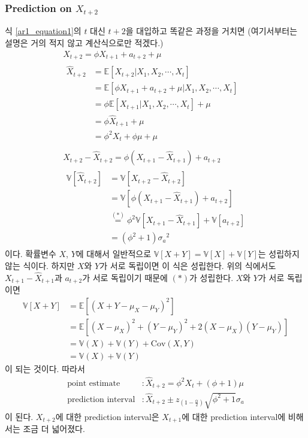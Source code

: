\documentclass{article}
\newcommand\cov{\ensuremath{\text{Cov}}}
\newcommand\sa{\ensuremath{{\sigma_a}}}
\begin{document}
\subsubsection{Prediction on \(X_{t+2}\)}
식 \eqref{ar1_equation1}의 \(t\) 대신 \(t+2\)을 대입하고 똑같은 과정을 거치면
(여기서부터는 설명은 거의 적지 않고 계산식으로만 적겠다.)
\begin{gather*}
X_{t+2}=\phi X_{t+1}+a_{t+2}+\mu\\
\begin{aligned}
\hat X_{t+2}
&=\mathbb E[X_{t+2}|X_1,X_2,\cdots,X_t]\\
&=\mathbb E[\phi X_{t+1}+a_{t+2}+\mu|X_1,X_2,\cdots,X_t]\\
&=\phi\mathbb E[X_{t+1}|X_1,X_2,\cdots,X_t]+\mu\\
&=\phi\hat X_{t+1}+\mu\\
&=\phi^2X_t+\phi\mu+\mu\\
\end{aligned}\\
X_{t+2}-\hat X_{t+2}=\phi\left(X_{t+1}-\hat X_{t+1}\right)+a_{t+2}\\
\begin{aligned}
\mathbb V[\hat X_{t+2}]
&=\mathbb V[X_{t+2}-\hat X_{t+2}]\\
&=\mathbb V[\phi\left(X_{t+1}-\hat X_{t+1}\right)+a_{t+2}]\\
&\stackrel{(*)}=\phi^2\mathbb V\left[X_{t+1}-\hat X_{t+1}\right]+\mathbb V[a_{t+2}]\\
&=(\phi^2+1)\sa^2
\end{aligned}
\end{gather*}
이다.
확률변수 \(X\), \(Y\)에 대해서 일반적으로 \(\mathbb V[X+Y]=\mathbb V[X]+\mathbb V[Y]\)는 성립하지 않는 식이다.
하지만 \(X\)와 \(Y\)가 서로 독립이면 이 식은 성립한다.\footnotemark
위의 식에서도  \(X_{t+1}-\hat X_{t+1}\)과 \(a_{t+2}\)가 서로 독립이기 때문에 \((*)\)가 성립한다.
\(X\)와 \(Y\)가 서로 독립이면
\begin{align*}
\mathbb V[X+Y]
&=\mathbb E\left[(X+Y-\mu_X-\mu_Y)^2\right]\\
&=\mathbb E\left[(X-\mu_X)^2+(Y-\mu_Y)^2+2(X-\mu_X)(Y-\mu_Y)\right]\\
&=\mathbb V(X)+\mathbb V(Y)+\cov(X,Y)\\
&=\mathbb V(X)+\mathbb V(Y)
\end{align*}
이 되는 것이다.
따라서
\begin{align*}
\text{point estimate}		&:\hat X_{t+2} = \phi^2 X_t+(\phi+1)\mu\\
\text{prediction interval}	&:\hat X_{t+2}\pm z_{(1-\frac\alpha2)}\sqrt{\phi^2+1}\sa
\end{align*}
이 된다.
\(X_{t+2}\)에 대한 prediction interval은 \(X_{t+1}\)에 대한 prediction interval에 비해서는 조금 더 넓어졌다.
\end{document}
